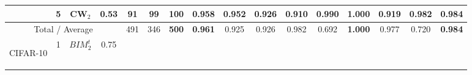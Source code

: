 \begin{table}[tph]
\begin{adjustbox}{angle=90}
{\begin{tabular}{c|c|cc|ccc|ccc|ccc|ccc}
                \\
                                                                        & 5
                                                                        & CW$_{2}$                       & 0.53
                                                                        & 91                             & 99
                                                                        &
                \textbf{100}
                                                                        &
                \textbf{0.958}
                                                                        & 0.952
                                                                        & 0.926                          &
                0.910                                                   & 0.990
                                                                        &
                \textbf{1.000}
                                                                        & 0.919
                                                                        &
                \textbf{0.982}
                                                                        & 0.984
                \\
                \hline
                \multicolumn{4}{c|}{Total / Average}                    & 491
                                                                        & 346                            &
                \textbf{500}
                                                                        &
                \textbf{0.961}
                                                                        & 0.925
                                                                        & 0.926
                                                                        & 0.982
                                                                        & 0.692
                                                                        &
                \textbf{1.000}
                                                                        & 0.977
                                                                        & 0.720
                                                                        &
                \textbf{0.984}
                \\
                \midrule
                \multirow{6}{*}{\begin{turn}{90}CIFAR-10\end{turn}}     & 1
                                                                        & $BIM_{2}^{t}$                  & 0.75 &

\end{tabular}}
\end{adjustbox}
\end{table}
